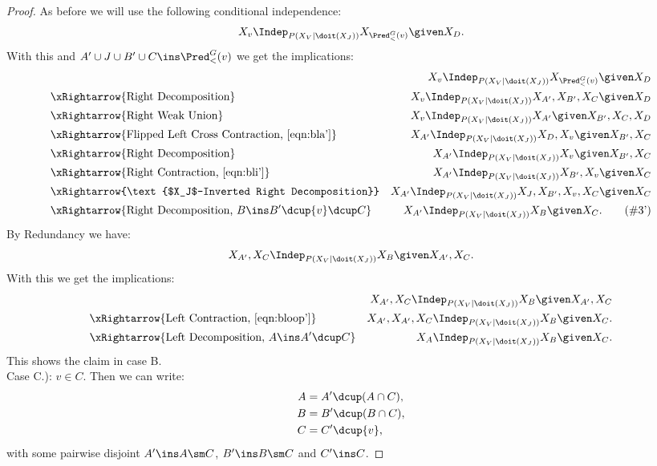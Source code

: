 \begin{Thm}
\begin{proof}
As before we will use the following conditional independence:
\[ X_v \Indep_{P(X_V|\doit(X_J))}  X_{\Pred^G_<(v)} \given X_D. \]
With this and $A' \cup J \cup B' \cup C \ins \Pred^G_<(v)$ we get the implications:
\begin{align*}
   && X_v \Indep_{P(X_V|\doit(X_J))} X_{\Pred^G_<(v)} \given X_D \\
    &\xRightarrow{\text{Right Decomposition}} & X_v \Indep_{P(X_V|\doit(X_J))} X_{A'},X_{B'},X_C \given X_D\\
& \xRightarrow{\text{Right Weak Union}}  &  X_v \Indep_{P(X_V|\doit(X_J))} X_{A'} \given X_{B'},X_C,X_D\\
& \xRightarrow{\text{Flipped Left Cross Contraction, }\eqref{eqn:bla'}}  
& X_{A'}  \Indep_{P(X_V|\doit(X_J))} X_D,X_v \given X_{B'},X_C \\
& \xRightarrow{\text{Right Decomposition}}  
& X_{A'}  \Indep_{P(X_V|\doit(X_J))} X_v \given X_{B'},X_C \\
& \xRightarrow{\text{Right Contraction, }\eqref{eqn:bli'}}  
& X_{A'}  \Indep_{P(X_V|\doit(X_J))} X_{B'},X_v \given X_C \\
& \xRightarrow{\text{$X_J$-Inverted Right Decomposition}}  & X_{A'}  \Indep_{P(X_V|\doit(X_J))} X_J,X_{B'},X_v,X_C \given X_C \\
& \xRightarrow{\text{Right Decomposition, } B \ins B'\dcup \{v\} \dcup C}  & X_{A'}  \Indep_{P(X_V|\doit(X_J))} X_B \given X_C.  \label{eqn:bloop'} \tag{\#3'}
\end{align*}
By Redundancy we have:
\[ X_{A'}, X_C \Indep_{P(X_V|\doit(X_J))}  X_B \given X_{A'},X_C. \]
With this we get the implications:
\begin{align*}
&&X_{A'}, X_C \Indep_{P(X_V|\doit(X_J))}  X_B \given X_{A'},X_C\\
& \xRightarrow{\text{Left Contraction, } \eqref{eqn:bloop'}}  &  
X_{A'},X_{A'}, X_C \Indep_{P(X_V|\doit(X_J))}  X_B \given X_C.\\
& \xRightarrow{\text{Left Decomposition, } A \ins A' \dcup C}  &    
X_A \Indep_{P(X_V|\doit(X_J))}  X_B \given X_C. 
\end{align*}
This shows the claim in case B.\\


Case C.): $v \in C$.
 Then we can write:
\begin{align*}
    A &= A' \dcup (A \cap C), \\
    B &= B' \dcup (B \cap C),\\
    C &= C' \dcup \{v\},
\end{align*}
with some pairwise disjoint $A' \ins A \sm C$, 
$B' \ins B \sm C$ and
$C' \ins C$.


\end{proof}
\end{Thm}
